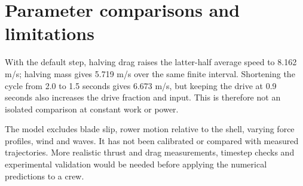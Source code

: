 \documentclass[11pt]{article}
\begin{document}
\section{Parameter comparisons and limitations}
With the default step, halving drag raises the latter-half average speed to 8.162 m/s; halving mass gives 5.719 m/s over the same finite interval. Shortening the cycle from 2.0 to 1.5 seconds gives 6.673 m/s, but keeping the drive at 0.9 seconds also increases the drive fraction and input. This is therefore not an isolated comparison at constant work or power.

The model excludes blade slip, rower motion relative to the shell, varying force profiles, wind and waves. It has not been calibrated or compared with measured trajectories. More realistic thrust and drag measurements, timestep checks and experimental validation would be needed before applying the numerical predictions to a crew.
\end{document}
